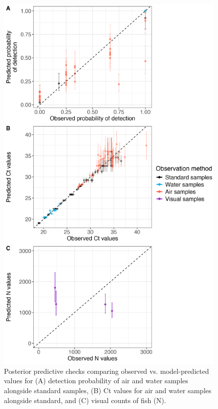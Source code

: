 \documentclass{article}
\begin{document}
\clearpage
\begin{figure}[tbhp] 
\centering
\includegraphics[width=12.0cm]{Plots/Diagnostic_Fig_3.jpg}  
\caption{Posterior predictive checks comparing observed vs. model-predicted values for (A) detection probability of air and water samples alongside standard samples, (B) Ct values for air and water samples alongside standard, and (C) visual counts of fish (N).}
\label{fig:postpred}
\end{figure}
\end{document}
